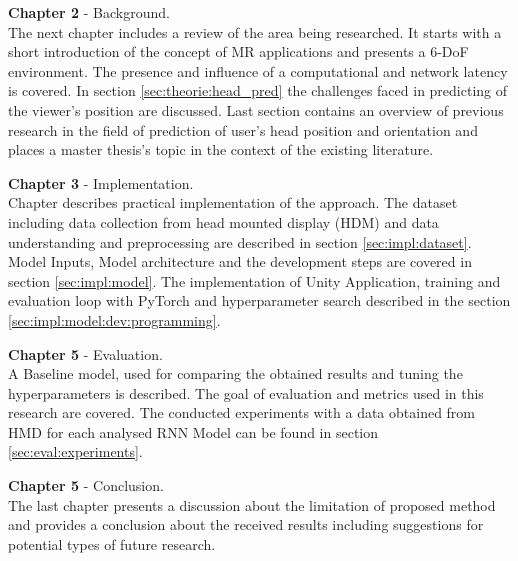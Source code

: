 \textbf{Chapter 2} - Background.\\
The next chapter includes a review of the area being researched. It starts with a short introduction of the concept of MR applications and presents a 6-DoF environment. The presence and influence of a computational and network latency is covered. In section \ref{sec:theorie:head_pred} the challenges faced in predicting of the viewer's position are discussed. Last section contains an overview of previous research in the field of prediction of user's head position and orientation and places a master thesis's topic in the context of the existing literature. 

\textbf{Chapter 3} - Implementation.\\
Chapter describes practical implementation of the approach. The dataset including data collection from head mounted display (HDM) and data understanding and preprocessing are described in section \ref{sec:impl:dataset}. Model Inputs, Model architecture and the development steps are covered in section \ref{sec:impl:model}. The implementation of Unity Application, training and evaluation loop with PyTorch and hyperparameter search described in the section \ref{sec:impl:model:dev:programming}.


\textbf{Chapter 5} - Evaluation.\\
A Baseline model, used for comparing the obtained results and tuning the hyperparameters is described. The goal of evaluation and metrics used in this research are covered. The conducted experiments with a data obtained from HMD for each analysed RNN Model can be found in section \ref{sec:eval:experiments}.

\textbf{Chapter 5} - Conclusion.\\
The last chapter presents a discussion about the limitation of proposed method and provides a conclusion about the received results including suggestions for potential types of future research.